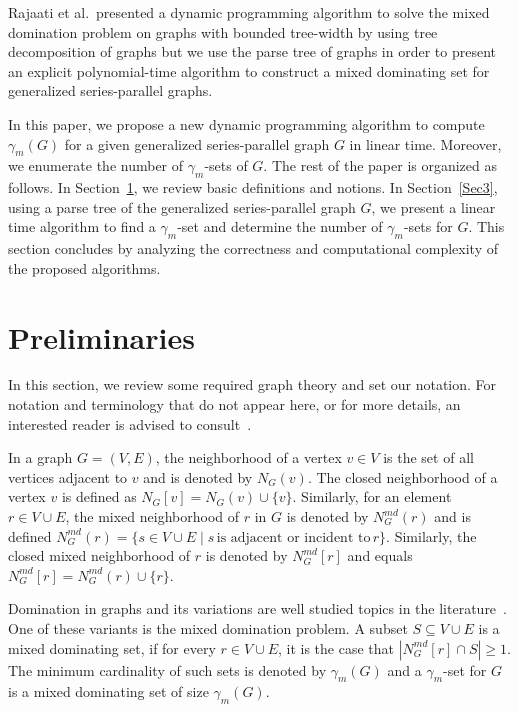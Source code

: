 \documentclass[12pt]{article}
\theoremstyle{definition}
\theoremstyle{remark}
\begin{document}
Rajaati et al.~presented a dynamic programming algorithm to solve the mixed domination problem on graphs with bounded tree-width by using tree decomposition of graphs but we use the parse tree of graphs in order to present an explicit polynomial-time algorithm to construct a mixed dominating set for generalized  series-parallel graphs.

In this paper, we propose a new dynamic programming algorithm to compute $\gamma_m(G)$ for a given generalized series-parallel graph $G$ in linear time. Moreover, we enumerate the number of $\gamma_m$-sets of $G$.
The rest of the paper is organized as follows. 
 In Section~\ref{Sec2}, we review basic definitions and  notions. 
  In Section~\ref{Sec3}, using a parse tree of the generalized series-parallel graph $G$, we present
a linear time algorithm to find a $\gamma_m$-set and determine the number of $\gamma_m$-sets for $G$. This section concludes by  analyzing the correctness and computational complexity of the proposed algorithms. 



\section{Preliminaries}\label{Sec2}
In this section, we review some required graph theory and set our notation. For
notation and terminology that do not appear here, or for more details, an interested reader is advised to consult~\cite{west2001introduction}.
 
 In a graph $G = (V, E)$, the neighborhood of a vertex $v \in V$ is the set of all vertices adjacent to $v$ and is denoted by $N_G(v)$. The closed neighborhood of a vertex $v$ is defined as $N_G[v] = N_G(v) \cup \{v \}$.
Similarly, for an element $r\in V \cup E$, the mixed neighborhood of $r$ in $G$ is denoted by $N^{md}_{G}(r)$ and is defined $N^{md}_G(r) = \{ s\in V \cup E \mid   s\, \text{is adjacent or incident to}\, r \}$. Similarly, the closed mixed neighborhood of $r$ is denoted by $N^{md}_G[r]$ and equals $N^{md}_G[r] =N^{md}_G(r)\cup \{r\}$.

Domination in graphs and its variations are well studied topics in the literature~\cite{haynes1998fundamentals,haynes1997domination}. One of these variants is the mixed domination problem. 
A subset $ S \subseteq V \cup E$ is a mixed dominating set, if for every $r\in V \cup E$, it is the case that $|N^{md}_G[r] \cap S|\geq 1 $. The minimum cardinality of  such sets is denoted by $\gamma_{m}(G)$ and a $\gamma_m$-set for $G$ is a mixed dominating set of size $\gamma_{m}(G)$.
\end{document}
